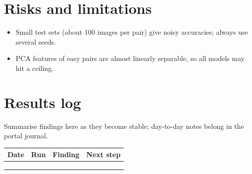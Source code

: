 \documentclass[11pt,a4paper]{article}
\begin{document}
\section{Risks and limitations}
\begin{itemize}
  \item Small test sets (about 100 images per pair) give noisy accuracies; always use several seeds.
  \item PCA features of easy pairs are almost linearly separable, so all models may hit a ceiling.
\end{itemize}

\section{Results log}
\label{sec:log}
Summarise findings here as they become stable; day-to-day notes belong in the portal journal.

\begin{table}[h]
\centering\small
\begin{tabularx}{\linewidth}{@{}l l >{\raggedright}X >{\raggedright\arraybackslash}X@{}}
\toprule
Date & Run & Finding & Next step \\
\midrule
 & & & \\
 & & & \\
 & & & \\
\bottomrule
\end{tabularx}
\end{table}



\end{document}
